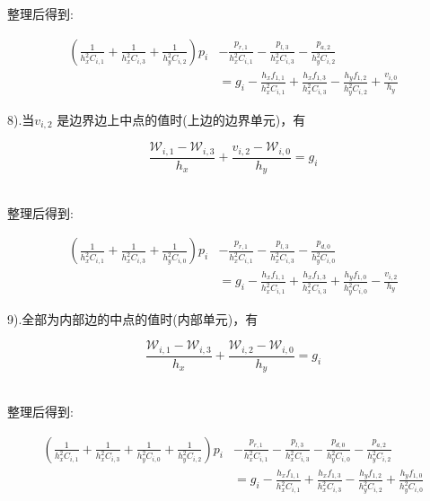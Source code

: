 \documentclass[leqno]{article}
\begin{document}
整理后得到:

\begin{equation*}
\begin{aligned}
(\frac{1}{h_x^2C_{i,1}} + \frac{1}{h_x^2C_{i,3}} + \frac{1}{h_y^2C_{i,2}})p_i & - \frac{p_{r,1}}{h_x^2C_{i,1}} - \frac{p_{l,3}}{h_x^2C_{i,3}} - \frac{p_{a,2}}{h_y^2C_{i,2}} \\ 
& = g_i - \frac{h_xf_{1,1}}{h_x^2C_{i,1}} + \frac{h_xf_{1,3}}{h_x^2C_{i,3}} - \frac{h_yf_{1,2}}{h_y^2C_{i,2}} + \frac{v_{i,0}}{h_y}
\end{aligned}
\end{equation*}

8).当$v_{i,2}$ 是边界边上中点的值时(上边的边界单元)，有

\begin{equation*}
\frac{ \mathcal{W}_{i,1} - \mathcal{W}_{i,3}}{h_x} + \frac{ v_{i,2} - \mathcal{W}_{i,0}}{h_y} = g_i
\end{equation*}　

整理后得到:

\begin{equation*}
\begin{aligned}
(\frac{1}{h_x^2C_{i,1}} + \frac{1}{h_x^2C_{i,3}} + \frac{1}{h_y^2C_{i,0}})p_i & - \frac{p_{r,1}}{h_x^2C_{i,1}} - \frac{p_{l,3}}{h_x^2C_{i,3}} - \frac{p_{d,0}}{h_y^2C_{i,0}}\\
 & = g_i - \frac{h_xf_{1,1}}{h_x^2C_{i,1}} + \frac{h_xf_{1,3}}{h_x^2C_{i,3}} + \frac{h_yf_{1,0}}{h_y^2C_{i,0}} - \frac{v_{i,2}}{h_y}
\end{aligned}
\end{equation*}

9).全部为内部边的中点的值时(内部单元)，有

\begin{equation*}
\frac{ \mathcal{W}_{i,1} - \mathcal{W}_{i,3}}{h_x} + \frac{ \mathcal{W}_{i,2} - \mathcal{W}_{i,0}}{h_y} = g_i
\end{equation*}　

整理后得到:

\begin{equation*}
\begin{aligned}
(\frac{1}{h_x^2C_{i,1}} + \frac{1}{h_x^2C_{i,3}} + \frac{1}{h_y^2C_{i,0}} + \frac{1}{h_y^2C_{i,2}})p_i & - \frac{p_{r,1}}{h_x^2C_{i,1}} - \frac{p_{l,3}}{h_x^2C_{i,3}} - \frac{p_{d,0}}{h_y^2C_{i,0}} - \frac{p_{a,2}}{h_y^2C_{i,2}} \\
& = g_i - \frac{h_xf_{1,1}}{h_x^2C_{i,1}} + \frac{h_xf_{1,3}}{h_x^2C_{i,3}} - \frac{h_yf_{1,2}}{h_y^2C_{i,2}} + \frac{h_yf_{1,0}}{h_y^2C_{i,0}}
\end{aligned}
\end{equation*}
\end{document}
